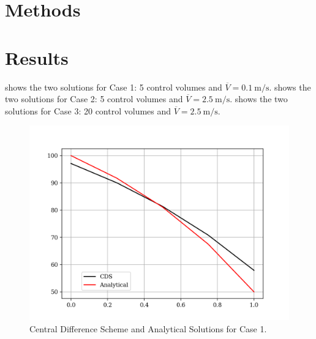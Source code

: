 \documentclass[12pt]{article}
\begin{document}
\section{Methods}


\section{Results}
     shows the two solutions for Case 1: 5 control volumes and $\overline{V}=\SI{0.1}{\meter\per\second}$.
     shows the two solutions for Case 2: 5 control volumes and $\overline{V}=\SI{2.5}{\meter\per\second}$.
     shows the two solutions for Case 3: 20 control volumes and $\overline{V}=\SI{2.5}{\meter\per\second}$.
    \begin{figure}[htbp]
        \centering
        \includegraphics[width=\textwidth]{plots/graph_case1.png}
        \caption{Central Difference Scheme and Analytical Solutions for Case 1.}
        \label{fig:case1}
    \end{figure}
\end{document}
